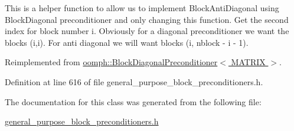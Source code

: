 This is a helper function to allow us to implement Block\+Anti\+Diagonal using Block\+Diagonal preconditioner and only changing this function. Get the second index for block number i. Obviously for a diagonal preconditioner we want the blocks (i,i). For anti diagonal we will want blocks (i, nblock -\/ i -\/ 1). 

Reimplemented from \hyperlink{classoomph_1_1BlockDiagonalPreconditioner_acb723bba0b200adc25c9df9003c09205}{oomph\+::\+Block\+Diagonal\+Preconditioner$<$ M\+A\+T\+R\+I\+X $>$}.



Definition at line 616 of file general\+\_\+purpose\+\_\+block\+\_\+preconditioners.\+h.



The documentation for this class was generated from the following file\+:\begin{DoxyCompactItemize}
\item 
\hyperlink{general__purpose__block__preconditioners_8h}{general\+\_\+purpose\+\_\+block\+\_\+preconditioners.\+h}\end{DoxyCompactItemize}
